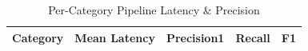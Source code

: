 \begin{table}[h]
\caption{Per-Category Pipeline Latency \& Precision}
\label{tab:categories}
\centering
\begin{tabular}{|l|r|c|c|c|}
\hline
Category & Mean Latency & Precision\@1 & Recall & F1 \\
\hline
\hline
\end{tabular}
\end{table}
